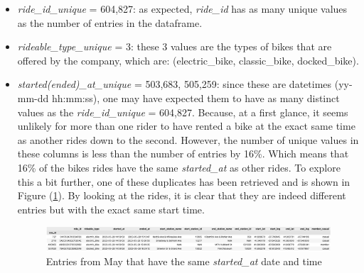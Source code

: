 \documentclass[12pt]{article}
\begin{document}
\begin{itemize}
	\begin{itemize}
	\item \textit{ride\_id\_unique}  = 604,827: as expected, \textit{ride\_id} has as many unique values as the number of entries in the dataframe.
	\item \textit{rideable\_type\_unique} = 3: these 3 values are the types of bikes that are offered by the company, which are: \Big(electric\_bike, classic\_bike, docked\_bike\Big).
	\item \textit{started(ended)\_at\_unique} = 503,683,  505,259: since these are datetimes (yy-mm-dd hh:mm:ss), one may have expected them to have as many distinct values as the \textit{ride\_id\_unique} = 604,827. Because, at a first glance, it seems unlikely for more than one rider to have rented a bike at the exact same time as another rides down to the second. However, the number of unique values in these columns is less than the number of entries by 16\%. Which means that 16\% of the bikes rides have the same \textit{started\_at} as other rides. To explore this a bit further, one of these duplicates has been retrieved and is shown in Figure (\ref{fig10}). By looking at the rides, it is clear that they are indeed different entries but with the exact same start time. \\
	
	\begin{figure}[h]
	\hspace{-0.5in}
	\includegraphics[scale=0.46]{imgDups1.png}
	\caption{Entries from May that have the same \textit{started\_at} date and time}
	\label{fig10}
	\end{figure}
	

\end{itemize}
\end{itemize}
\end{document}
